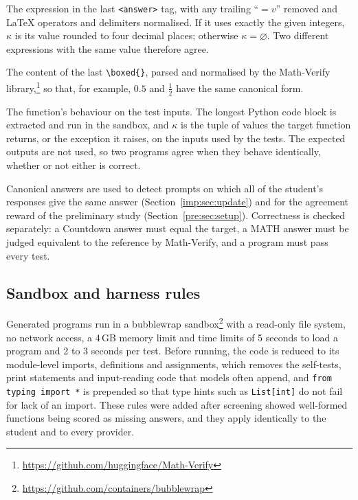 \begin{description}[itemsep=3pt,topsep=4pt]
  \item[Countdown.] The expression in the last \texttt{<answer>} tag, with any trailing
    ``$= v$'' removed and LaTeX operators and delimiters normalised. If it uses exactly
    the given integers, $\kappa$ is its value rounded to four decimal places; otherwise
    $\kappa = \varnothing$. Two different expressions with the same value therefore
    agree.
  \item[MATH.] The content of the last \verb|\boxed{}|, parsed and normalised by the
    Math-Verify library,\footnote{\url{https://github.com/huggingface/Math-Verify}} so
    that, for example, $0.5$ and $\frac{1}{2}$ have the same canonical form.
  \item[Code.] The function's behaviour on the test inputs. The longest Python code block
    is extracted and run in the sandbox, and $\kappa$ is the tuple of values the target
    function returns, or the exception it raises, on the inputs used by the tests. The
    expected outputs are not used, so two programs agree when they behave identically,
    whether or not either is correct.
\end{description}

Canonical answers are used to detect prompts on which all of the student's responses
give the same answer (Section~\ref{imp:sec:update}) and for the agreement reward of the
preliminary study (Section~\ref{pre:sec:setup}). Correctness is checked separately: a Countdown answer must equal the target, a MATH answer must be
judged equivalent to the reference by Math-Verify, and a program must pass every test.

\subsection{Sandbox and harness rules}
\label{imp:sec:sandbox}

Generated programs run in a bubblewrap sandbox\footnote{\url{https://github.com/containers/bubblewrap}}
with a read-only file system, no network access, a 4\,GB memory limit and time limits
of 5 seconds to load a program and 2 to 3 seconds per test. Before running, the code is
reduced to its module-level imports, definitions and assignments, which removes the
self-tests, print statements and input-reading code that models often append, and
\texttt{from typing import *} is prepended so that type hints such as
\texttt{List[int]} do not fail for lack of an import. These rules were added after
screening showed well-formed functions being scored as missing answers, and they apply
identically to the student and to every provider.

